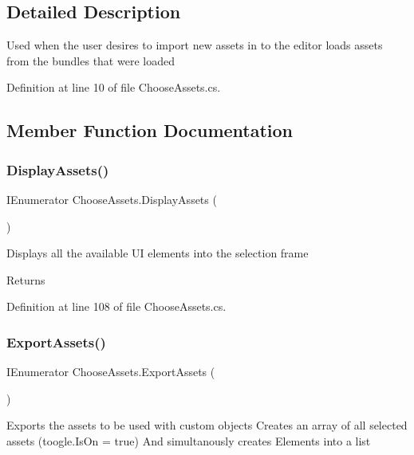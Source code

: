 \subsection{Detailed Description}
Used when the user desires to import new assets in to the editor loads assets from the bundles that were loaded 



Definition at line 10 of file Choose\+Assets.\+cs.



\subsection{Member Function Documentation}
\mbox{\label{class_choose_assets_a60025b6cba8c2b5f418416f43a8218eb}} 
\subsubsection{Display\+Assets()}
{\footnotesize\ttfamily I\+Enumerator Choose\+Assets.\+Display\+Assets (\begin{DoxyParamCaption}{ }\end{DoxyParamCaption})}



Displays all the available UI elements into the selection frame 

\begin{DoxyReturn}{Returns}

\end{DoxyReturn}


Definition at line 108 of file Choose\+Assets.\+cs.

\mbox{\label{class_choose_assets_a99ebedc3eec2ed38293b96c28cd12612}} 
\subsubsection{Export\+Assets()}
{\footnotesize\ttfamily I\+Enumerator Choose\+Assets.\+Export\+Assets (\begin{DoxyParamCaption}{ }\end{DoxyParamCaption})}



Exports the assets to be used with custom objects Creates an array of all selected assets (toogle.\+Is\+On = true) And simultanously creates Elements into a list 


